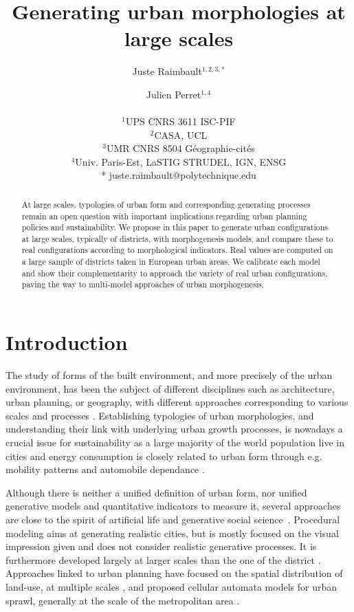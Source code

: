 \documentclass[letterpaper]{article}
\title{Generating urban morphologies at large scales}
\author{Juste Raimbault$^{1,2,3,*}$ \and Julien Perret$^{1,4}$ \\
\mbox{}\\
$^1$UPS CNRS 3611 ISC-PIF\\
$^2$CASA, UCL\\
$^3$UMR CNRS 8504 G{\'e}ographie-cit{\'e}s\\
$^4$Univ. Paris-Est, LaSTIG STRUDEL, IGN, ENSG\\
\medskip
* juste.raimbault@polytechnique.edu} %
\begin{document}
\maketitle

\begin{abstract}
  At large scales, typologies of urban form and corresponding generating processes remain an open question with important implications regarding urban planning policies and sustainability.
  We propose in this paper to generate urban configurations at large scales, typically of districts, with morphogenesis models, and compare these to real configurations according to morphological indicators.
  Real values are computed on a large sample of districts taken in European urban areas.
  We calibrate each model and show their complementarity to approach the variety of real urban configurations, paving the way to multi-model approaches of urban morphogenesis.
\end{abstract}


\section{Introduction}


The study of forms of the built environment, and more precisely of the urban environment, has been the subject of different disciplines such as architecture, urban planning, or geography, with different approaches corresponding to various scales and processes \citep{moudon1997urban,gauthier2006mapping,kropf2009aspects}.
Establishing typologies of urban morphologies, and understanding their link with underlying urban growth processes, is nowadays a crucial issue for sustainability as a large majority of the world population live in cities and energy consumption is closely related to urban form through e.g. mobility patterns and automobile dependance \citep{newman2000sustainable}.


Although there is neither a unified definition of urban form, nor unified generative models and quantitative indicators to measure it, several approaches are close to the spirit of artificial life and generative social science~\citep{bonabeau1997classical,epstein1999agent}.
Procedural modeling \citep{watson2008procedural} aims at generating realistic cities, but is mostly focused on the visual impression given and does not consider realistic generative processes.
It is furthermore developed largely at larger scales than the one of the district \citep{Parish:2001:PMC:383259.383292}.
Approaches linked to urban planning have focused on the spatial distribution of land-use, at multiple scales \citep{liu2017future}, and proposed cellular automata models for urban sprawl, generally at the scale of the metropolitan area \citep{herold2003spatiotemporal}.
\end{document}
